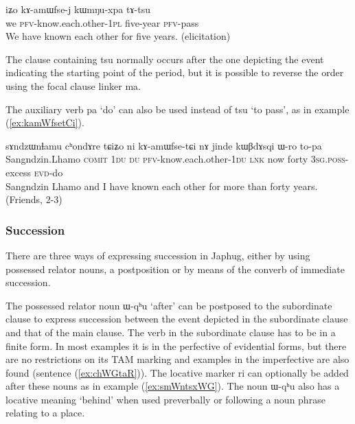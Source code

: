 \documentclass[oldfontcommands,oneside,a4paper,11pt]{article}
\newcommand{\ipa}[1]{{\phon \mbox{#1}}} %
\newcommand{\refb}[1]{(\ref{#1})}
\begin{document}
\begin{exe}
\ex \label{ex:kamWfsej}
\gll  
\ipa{iʑo}   	\ipa{kɤ-amɯfse-j}   	\ipa{kɯmŋu-xpa}   	\ipa{tɤ-tsu}   \\
we \textsc{pfv}-know.each.other-\textsc{1pl} five-year \textsc{pfv}-pass \\
\glt  We have known each other for five years. (elicitation)
\end{exe}


The clause containing \ipa{tsu} normally occurs after the one depicting the event indicating the starting point of the period, but it is possible to reverse the order using the focal clause linker \ipa{ma}.

The auxiliary verb \ipa{pa} `do' can also be used instead of \ipa{tsu} `to pass', as in example \refb{ex:kamWfsetCi}.
\begin{exe}
\ex \label{ex:kamWfsetCi}
\gll  
\ipa{sɤndzɯnɬamu}  	\ipa{cʰondɤre}  	\ipa{tɕiʑo}  	\ipa{ni}  	\ipa{kɤ-amɯfse-tɕi}  	\ipa{nɤ}  	\ipa{jinde}  	\ipa{kɯβdɤsqi}  	\ipa{ɯ-ro}  	\ipa{to-pa}  \\
Sangndzin.Lhamo \textsc{comit} \textsc{1du} \textsc{du}  \textsc{pfv}-know.each.other-\textsc{1du} \textsc{lnk} now forty  \textsc{3sg.poss}-excess \textsc{evd}-do \\
\glt Sangndzin Lhamo and I have known each other for more than forty years. (Friends, 2-3)
\end{exe}

\subsubsection{Succession} \label{sec:succession}
There are three ways of expressing succession in Japhug, either by using possessed relator nouns, a   postposition or by means of the  converb of immediate succession.  

The   possessed relator noun  \ipa{ɯ-qʰu} `after'  can be postposed to the subordinate clause to express succession between the event depicted in the subordinate clause and that of the main clause. The verb in the subordinate clause has to be in a finite form. In most examples it is in the perfective of evidential forms, but there are no restrictions on its TAM marking and examples in the imperfective are also found (sentence \refb{ex:chWGtaR}). The locative marker \ipa{ri} can optionally be added after these nouns as in example \refb{ex:smWntsxWG}.  The noun \ipa{ɯ-qʰu} also has a locative meaning `behind' when used preverbally or following a noun phrase relating to a place. 
\end{document}
